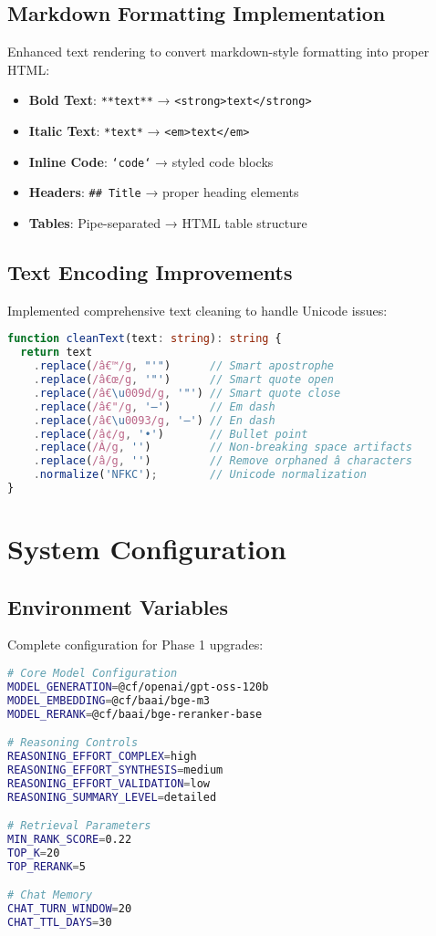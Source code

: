 \documentclass[12pt,a4paper]{article}
\begin{document}
\subsection{Markdown Formatting Implementation}
Enhanced text rendering to convert markdown-style formatting into proper HTML:

\begin{itemize}
    \item \textbf{Bold Text}: \texttt{**text**} → \texttt{<strong>text</strong>}
    \item \textbf{Italic Text}: \texttt{*text*} → \texttt{<em>text</em>}
    \item \textbf{Inline Code}: \texttt{`code`} → styled code blocks
    \item \textbf{Headers}: \texttt{\#\# Title} → proper heading elements
    \item \textbf{Tables}: Pipe-separated → HTML table structure
\end{itemize}

\subsection{Text Encoding Improvements}
Implemented comprehensive text cleaning to handle Unicode issues:

\begin{lstlisting}[language=typescript, caption=Text Cleaning Function]
function cleanText(text: string): string {
  return text
    .replace(/â€™/g, "'")      // Smart apostrophe
    .replace(/â€œ/g, '"')      // Smart quote open
    .replace(/â€\u009d/g, '"') // Smart quote close
    .replace(/â€"/g, '—')      // Em dash
    .replace(/â€\u0093/g, '–') // En dash
    .replace(/â¢/g, '•')       // Bullet point
    .replace(/Â/g, '')         // Non-breaking space artifacts
    .replace(/â/g, '')         // Remove orphaned â characters
    .normalize('NFKC');        // Unicode normalization
}
\end{lstlisting}

\section{System Configuration}

\subsection{Environment Variables}
Complete configuration for Phase 1 upgrades:

\begin{lstlisting}[language=bash, caption=Updated Environment Configuration]
# Core Model Configuration
MODEL_GENERATION=@cf/openai/gpt-oss-120b
MODEL_EMBEDDING=@cf/baai/bge-m3
MODEL_RERANK=@cf/baai/bge-reranker-base

# Reasoning Controls
REASONING_EFFORT_COMPLEX=high
REASONING_EFFORT_SYNTHESIS=medium
REASONING_EFFORT_VALIDATION=low
REASONING_SUMMARY_LEVEL=detailed

# Retrieval Parameters
MIN_RANK_SCORE=0.22
TOP_K=20
TOP_RERANK=5

# Chat Memory
CHAT_TURN_WINDOW=20
CHAT_TTL_DAYS=30
\end{lstlisting}
\end{document}
